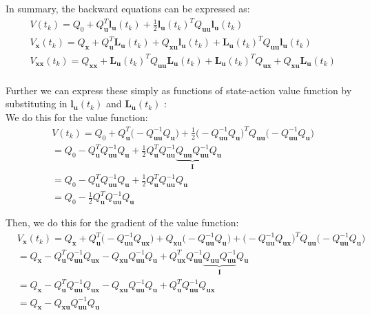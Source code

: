 \documentclass[11pt]{homework}
\renewcommand{\vec}[1]{\ensuremath{\boldsymbol{#1}}}
\begin{document}
\begin{arabicparts}
		In summary, the backward equations can be expressed as: 
			\begin{align*}
				& V(t_k) = Q_{0} + Q_{\vec{u}}^{T}\vec{l}_{\vec{u}}(t_{k}) + \frac{1}{2}\vec{l}_{\vec{u}}(t_{k})^{T}Q_{\vec{uu}}\vec{l}_{\vec{u}}(t_{k}) \\
				& V_{\vec{x}}(t_{k}) = Q_{\vec{x}} + Q_{\vec{u}}^{T}\vec{L}_{\vec{u}}(t_{k}) + Q_{\vec{xu}}\vec{l}_{\vec{u}}(t_{k}) + \vec{L}_{\vec{u}}(t_{k})^{T}Q_{\vec{uu}}\vec{l}_{\vec{u}}(t_{k}) \\
				& V_{\vec{xx}}(t_{k}) = Q_{\vec{xx}} + \vec{L}_{\vec{u}}(t_{k})^{T}Q_{\vec{uu}}\vec{L}_{\vec{u}}(t_{k}) + \vec{L}_{\vec{u}}(t_{k})^{T}Q_{\vec{ux}} + Q_{\vec{xu}}\vec{L}_{\vec{u}}(t_{k})  \\
			\end{align*}
			
		\newpage
		Further we can express these simply as functions of state-action value function by substituting in $\vec{l}_{\vec{u}}(t_{k})$ and $\vec{L}_{\vec{u}}(t_{k})$ : \\
		
		We do this for the value function: 
			\begin{align*}
				& V(t_k) = Q_{0} + Q_{\vec{u}}^{T}\Big(-Q_{\vec{uu}}^{-1}Q_{\vec{u}}\Big) + \frac{1}{2}\Big(-Q_{\vec{uu}}^{-1}Q_{\vec{u}}\Big)^{T}Q_{\vec{uu}}\Big(-Q_{\vec{uu}}^{-1}Q_{\vec{u}}\Big) \\
				& = Q_{0} - Q_{\vec{u}}^{T}Q_{\vec{uu}}^{-1}Q_{\vec{u}} + \frac{1}{2}Q_{\vec{u}}^{T}Q_{\vec{uu}}^{-1}\underbrace{Q_{\vec{uu}}Q_{\vec{uu}}^{-1}}_{\vec{I}}Q_{\vec{u}} \\
				& = Q_{0} - Q_{\vec{u}}^{T}Q_{\vec{uu}}^{-1}Q_{\vec{u}} + \frac{1}{2}Q_{\vec{u}}^{T}Q_{\vec{uu}}^{-1}Q_{\vec{u}} \\
				& = Q_{0} - \frac{1}{2}Q_{\vec{u}}^{T}Q_{\vec{uu}}^{-1}Q_{\vec{u}} 
			\end{align*}
			
		Then, we do this for the gradient of the value function: 
			\begin{align*}
				& V_{\vec{x}}(t_{k}) = Q_{\vec{x}} + Q_{\vec{u}}^{T}\Big(-Q_{\vec{uu}}^{-1}Q_{\vec{ux}}\Big) + Q_{\vec{xu}}\Big(-Q_{\vec{uu}}^{-1}Q_{\vec{u}} \Big)+ \Big(-Q_{\vec{uu}}^{-1}Q_{\vec{ux}}\Big)^{T}Q_{\vec{uu}}\Big(-Q_{\vec{uu}}^{-1}Q_{\vec{u}}\Big) \\
				& = Q_{\vec{x}} - Q_{\vec{u}}^{T}Q_{\vec{uu}}^{-1}Q_{\vec{ux}} - Q_{\vec{xu}}Q_{\vec{uu}}^{-1}Q_{\vec{u}} + Q_{\vec{ux}}^{T}Q_{\vec{uu}}^{-1}\underbrace{Q_{\vec{uu}}Q_{\vec{uu}}^{-1}}_{\vec{I}}Q_{\vec{u}} \\
				& = Q_{\vec{x}} - Q_{\vec{u}}^{T}Q_{\vec{uu}}^{-1}Q_{\vec{ux}} - Q_{\vec{xu}}Q_{\vec{uu}}^{-1}Q_{\vec{u}} + Q_{\vec{u}}^{T}Q_{\vec{uu}}^{-1}Q_{\vec{ux}} \\
				& = Q_{\vec{x}} - Q_{\vec{xu}}Q_{\vec{uu}}^{-1}Q_{\vec{u}} 
			\end{align*}
		

\end{arabicparts}
\end{document}
